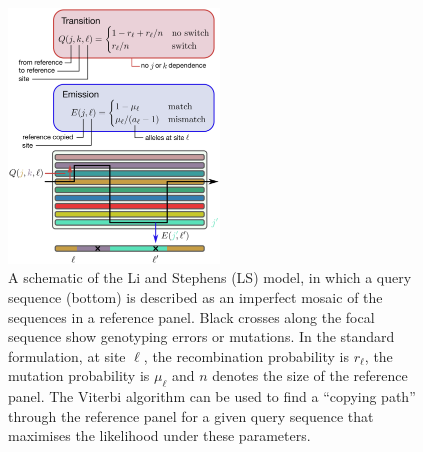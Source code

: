 \documentclass{article}
\begin{document}
\begin{figure} \centering
\includegraphics[width=0.5\textwidth]{figures/ls_diagram_covid.pdf}
\caption{\label{fig:ls_diagram} A schematic of the Li and Stephens (LS)
model, in which a query sequence (bottom) is described as an
imperfect mosaic of the sequences in a reference panel.
Black crosses along the focal sequence show genotyping
errors or mutations.
In the standard formulation, at site $\ell$, the recombination probability is $r_\ell$,
the mutation probability is $\mu_\ell$ and $n$
denotes the size of the reference panel.
The Viterbi algorithm can be used to find a
``copying path'' through the reference panel for a given query sequence that
maximises the likelihood under these parameters.
}
\end{figure}
\end{document}
